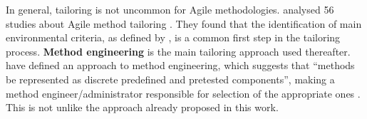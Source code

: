 \documentclass[a4paper,nobib,justified,final]{tufte-book}
\begin{document}
In general, tailoring is not uncommon for Agile methodologies. \citeauthor{campanelliAgileMethodsTailoring2015} analysed 56 studies about Agile method tailoring \autocite{campanelliAgileMethodsTailoring2015}. 
They found that the identification of main environmental criteria, as defined by \citeauthor{kalusCriteriaSoftwareProcess2013} \autocite{kalusCriteriaSoftwareProcess2013}, is a common first step in the tailoring process.
\textbf{Method engineering} is the main tailoring approach used thereafter. \citeauthor{fitzgeraldEmpiricalStudySystem} have defined an approach to method engineering, which suggests that ``methods be represented as discrete predefined and pretested components'', making a method engineer/administrator responsible for selection of the appropriate ones \autocite{fitzgeraldEmpiricalStudySystem}. This is not unlike the approach already proposed in this work.
\end{document}
